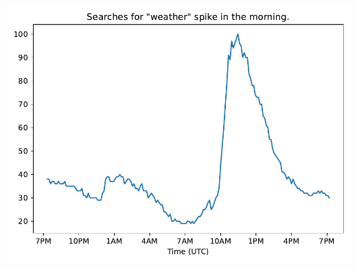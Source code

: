 
\begin{center}
    \includegraphics[width = .7\textwidth]{figures/proseplots/date-fmt2.pdf}
\end{center}
